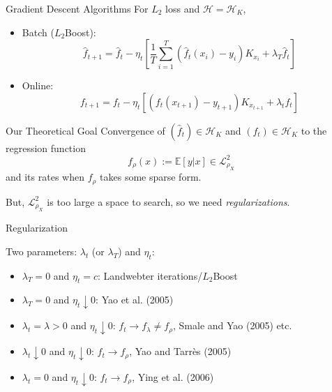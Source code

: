 \documentclass[pdf,slideColor,colorBG]{prosper}
\theoremstyle{theorem}
\theoremstyle{definition}
\theoremstyle{remark}
\def\E{{\mathbb E}}        %
\def\L{{\mathscr L}}
\def\L2{{\mathscr L}^2_{\rho_X}}
\def\H{{\mathscr H}}
\def\la{{\lambda}}
\begin{document}
%
\begin{slide}{Gradient Descent Algorithms}
For $L_2$ loss and $\H=\H_K$,
\begin{itemize}
\item Batch ($L_2$Boost):
\[ \hat{f}_{t+1} = \hat{f}_t - \eta_t \left[ \frac{1}{T}\sum_{i=1}^T (\hat{f}_t(x_i)- y_i) K_{x_i}  + \lambda_T \hat{f}_t \right] \]

\item Online:
\[ f_{t+1} = f_t - \eta_t [(f_t(x_{t+1})-y_{t+1})K_{x_{t+1}} + \lambda_t f_t ] \]

\end{itemize}
\end{slide}

%
\begin{slide}{Our Theoretical Goal}
Convergence of $(\hat{f}_t)\in \H_K$ and $(f_t)\in \H_K$ to the regression function
\[ f_\rho (x) := \E[y|x] \in \L2 \]
and its rates when $f_\rho$ takes some sparse form.

\medskip

But, $\L2$ is too large a space to search, so we need \emph{regularizations}.

\end{slide}

%
\begin{slide}{Regularization}

Two parameters: $\la_t$ (or $\la_T$) and $\eta_t$:
\begin{itemize}
\item $\la_T=0$ and $\eta_t=c$: Landwebter iterations/$L_2$Boost
\item $\la_T=0$ and $\eta_t\downarrow 0$: Yao et al. (2005)
\item $\la_t=\la>0$ and $\eta_t \downarrow 0$: $f_t\to f_\la \neq f_\rho$, Smale and Yao (2005) etc.
\item $\la_t\downarrow 0$ and $\eta_t\downarrow 0$: $f_t\to f_\rho$, Yao and Tarr\`es (2005)
\item $\la_t=0$ and $\eta_t\downarrow 0$: $f_t \to f_\rho$, Ying et al. (2006)
\end{itemize}

\end{slide}
\end{document}

